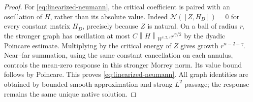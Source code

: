 \documentclass[reqno,11pt]{amsart}
\numberwithin{equation}{section}
\theoremstyle{definition}
\theoremstyle{remark}
\newcommand{\norm}[1]{\left\lVert#1\right\rVert}
\begin{document}
\begin{proof}
For \eqref{eq:linearized-neumann}, the critical coefficient is paired
with an oscillation of $H$, rather than its absolute value. Indeed
$\mathcal N([Z,H_D])=0$ for every constant matrix $H_D$, precisely
because $Z$ is natural. On a ball of radius $r$, the stronger graph
has oscillation at most $C\norm H_{W^{1,2,\nu}}r^{\gamma/2}$ by
the dyadic Poincare estimate. Multiplying by the critical energy of
$Z$ gives growth $r^{n-2+\gamma}$. Near--far summation, using the
same constant cancellation on each annulus, controls the mean-zero
response in this stronger Morrey norm. Its value bound follows by
Poincare. This proves \eqref{eq:linearized-neumann}. All graph
identities are obtained by bounded smooth approximation and strong
$L^2$ passage; the response remains the same unique native solution.
\end{proof}
\end{document}
